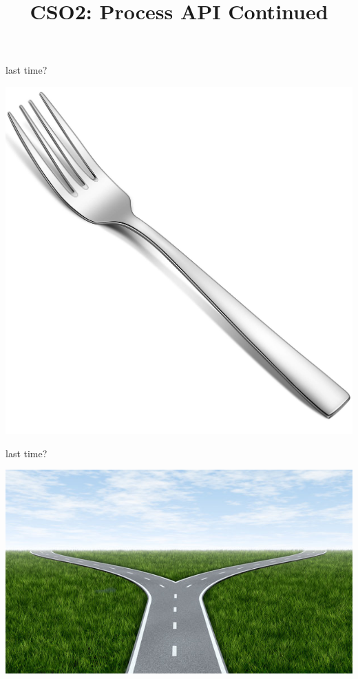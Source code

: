 \date{}
\title{CSO2: Process API Continued}
\date{}










\begin{frame}{last time?}
\begin{center}
    \includegraphics[width=0.4\pagewidth]{fork.jpg}
\end{center}
\end{frame}
\begin{frame}{last time?}
\begin{center}
    \includegraphics[width=0.7\pagewidth]{forkroad.jpg}
\end{center}
\end{frame}


